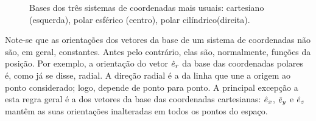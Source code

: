 \begin{figure}[htb]
{\par
}
\caption{Bases dos três sistemas de coordenadas mais usuais: cartesiano
(esquerda), polar esférico (centro), polar
cilíndrico(direita).\label{fig:10-016}}
\end{figure}
Note-se que as orientações dos vetores da base de um sistema de coordenadas não
são, em geral, constantes. Antes pelo contrário, elas são, normalmente, funções da
posição. Por exemplo, a orientação do vetor $\hat e_r$ da base das coordenadas
polares é, como já se disse, radial. A direção radial é a da linha que une a
origem ao ponto considerado; logo, depende de ponto para ponto. A principal
excepção a esta regra geral é a dos vetores da base das coordenadas cartesianas:
$\hat e_x$, $\hat e_y$ e $\hat e_z$ mantêm as suas orientações inalteradas em todos os
pontos do espaço.

